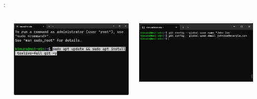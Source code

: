 \documentclass[aspectratio=169,dvipdfmx,cjk]{beamer}
\begin{document}
\begin{frame}{\insertsection \thesubsection: \insertsubsection}
\begin{columns}
\begin{column}{0.2\textwidth}
    \end{column}
    \begin{column}{0.3\textwidth}
      \includegraphics[width=1.0\linewidth]{fig/texlive.png}
    \end{column}
    \begin{column}{0.35\textwidth}
      \includegraphics[width=1.0\linewidth]{fig/git-config.png}
    \end{column}
  \end{columns}
\end{frame}
\end{document}
